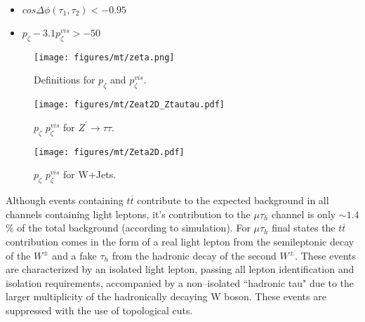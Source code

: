 \begin{itemize}
  \item $cos\Delta\phi(\tau_{1},\tau_{2}) < -0.95$
  \item $p_{\zeta} - 3.1 p_{\zeta}^{vis} > -50$
\end{itemize}
\begin{figure}
\begin{center}
\texttt{[image: figures/mt/zeta.png]}
\caption{ Definitions for $p_{\zeta}$ and $p_{\zeta}^{vis}$.}
\label{fig:ZetaDiagram}
\end{center}
\end{figure}
\begin{figure}
\begin{center}
\texttt{[image: figures/mt/Zeat2D\_Ztautau.pdf]}
\caption{ $p_{\zeta}$ $p_{\zeta}^{vis}$ for $Z^{\prime}\rightarrow\tau\tau$.}
\label{fig:WjetsZeta1}
\end{center}
\end{figure}
\begin{figure}
\begin{center}
\texttt{[image: figures/mt/Zeta2D.pdf]}
\caption{ $p_{\zeta}$ $p_{\zeta}^{vis}$ for W+Jets.}
\label{fig:WjetsZeta2}
\end{center}
\end{figure}

Although events containing $t\overline{t}$ contribute to the expected background in all channels containing light leptons, it's contribution to the $\mu\tau_{h}$ 
channel is only $\sim 1.4$\% of the total background (according to simulation). For $\mu\tau_{h}$ final states the 
$t\overline{t}$ contribution comes in the form of a real light lepton from the semileptonic decay of the
$W^\pm$ and a fake $\tau_{h}$ from the hadronic decay of the second $W^\pm$. These events are characterized by an isolated light lepton, passing all lepton 
identification and isolation requirements, accompanied by a non--isolated ``hadronic tau" due to the
larger multiplicity of the hadronically decaying W boson. 
These events are suppressed with the use of topological cuts.

